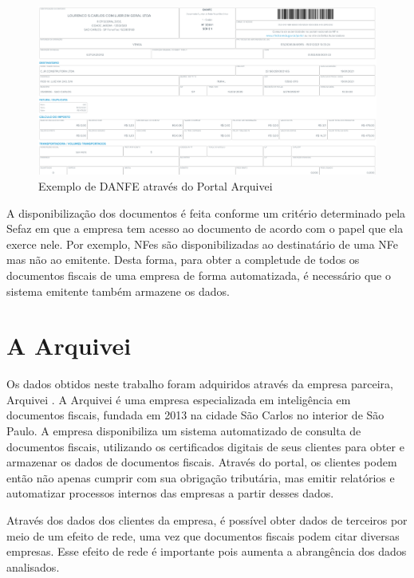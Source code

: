 \begin{figure}[htb]
    \centering
    \caption{Exemplo de DANFE através do Portal Arquivei}
    \label{fig:nfe}
    \includegraphics[scale=0.25]{images/nfe.png}
    \fautor
\end{figure}

A disponibilização dos documentos é feita conforme um critério determinado pela Sefaz em que a empresa tem acesso ao documento de acordo com o papel que ela exerce nele. Por exemplo, NFes são disponibilizadas ao destinatário de uma NFe mas não ao emitente. Desta forma, para obter a completude de todos os documentos fiscais de uma empresa de forma automatizada, é necessário que o sistema emitente também armazene os dados.

\section{A Arquivei}
\label{section:documentos-fiscais:arquivei}

Os dados obtidos neste trabalho foram adquiridos através da empresa parceira, Arquivei \cite{portal-arquivei}. A Arquivei é uma empresa especializada em inteligência em documentos fiscais, fundada em 2013 na cidade São Carlos no interior de São Paulo. A empresa disponibiliza um sistema automatizado de consulta de documentos fiscais, utilizando os certificados digitais de seus clientes para obter e armazenar os dados de documentos fiscais. Através do portal, os clientes podem então não apenas cumprir com sua obrigação tributária, mas emitir relatórios e automatizar processos internos das empresas a partir desses dados.

Através dos dados dos clientes da empresa, é possível obter dados de terceiros por meio de um efeito de rede, uma vez que documentos fiscais podem citar diversas empresas. Esse efeito de rede é importante pois aumenta a abrangência dos dados analisados.

